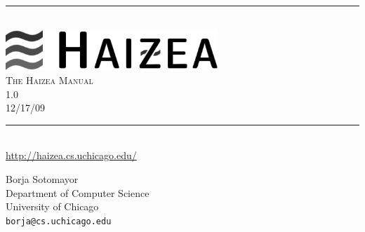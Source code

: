 \newcommand{\HRule}{\rule{\linewidth}{0.5mm}}

\begin{titlepage}
 
\begin{center}
 
\HRule \\[0.4cm]
\includegraphics[width=0.6\textwidth]{images/haizea.png}\\[1cm]
\textsc{ \huge The Haizea Manual}\\{\large 1.0}\\{\large 12/17/09}\\[0.4cm]
 
\HRule \\[1.5cm]
\url{http://haizea.cs.uchicago.edu/}

\vfill
 
\begin{flushright} \large
Borja Sotomayor\\
Department of Computer Science\\
University of Chicago\\
\texttt{borja@cs.uchicago.edu}
\end{flushright}
 
\end{center}
 
\end{titlepage}
